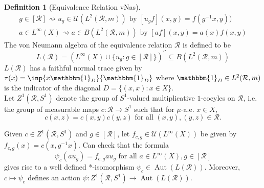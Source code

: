 \documentclass[12pt]{article}
\newcommand{\sub}{\subseteq}
\DeclareMathOperator{\Aut}{Aut}
\newcommand{\ind}{\mathbbm{1}}
\theoremstyle{definition}
\newtheorem{definition}{Definition}[]
\theoremstyle{plain}
\theoremstyle{remark}
\begin{document}
\begin{definition}[Equivalence Relation vNas]
    \begin{align*}
        g\in[\mathcal{R}] \rightsquigarrow u_{g}\in \mathcal{U}(L^{2}(\mathcal{R},m)) \text{ by } [u_{g}f](x,y) = f(g^{-1}x,y)) \\
        a\in L^{\infty}(X) \rightsquigarrow a\in B(L^{2}(\mathcal{R},m)) \text{ by } [af](x,y) = a(x)f(x,y) 
    \end{align*}
    The von Neumann algebra of the equivalence relation $ \mathcal{R} $ is defined to be 
    \[
        L(\mathcal{R}) = (L^{\infty}(X)\cup \{u_{g}:g\in[\mathcal{R}]\})^{\prime\prime} \sub B(L^{2}(\mathcal{R},m))
    \]
    $ L(\mathcal{R}) $ has a faithful normal trace given by $ \tau(x) = \inp{x\ind_{D}}{\ind_{D}} $ where $ \ind_{D}\in L^{2}(\mathcal{R},m)$ is the indicator of the diagonal $ D = \{(x,x): x\in X\} $.\\

    Let $ Z^{1}(\mathcal{R}, S^{1}) $ denote the group of $ S^{1} $-valued multiplicative $ 1 $-cocyles on $ \mathcal{R} $, i.e. the group of measurable maps $ c:\mathcal{R}\to S^{1} $ such that for $ \mu $-a.e. $ x\in X $,
    \[
        c(x,z) = c(x,y)c(y,z) \text{ for all }  (x,y), (y,z)\in \mathcal{R}.
    \]

    Given $ c\in Z^{1}(\mathcal{R},S^{1}) $ and $ g\in[\mathcal{R}] $, let $ f_{c,g}\in \mathcal{U}(L^{\infty}(X)) $ be given by $ f_{c,g}(x) = c(x,g^{-1}x) $. Can check that the formula 
    \[
        \psi_{c}(au_{g}) = f_{c,g}au_{g} \text{ for all } a\in L^{\infty}(X), g\in [\mathcal{R}]
    \]
    gives rise to a well defined *-isomorphism $ \psi_{c}\in \Aut(L(\mathcal{R})) $. Moreover, $ c\mapsto \psi_{c} $ defines an action $ \psi:Z^{1}(\mathcal{R},S^{1}) \to \Aut(L(\mathcal{R})) $.
\end{definition}
\end{document}
